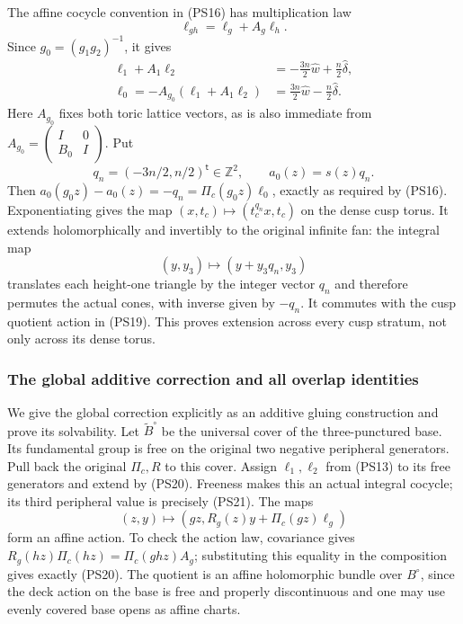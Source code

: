 The affine cocycle convention in (PS16) has multiplication law
\[
                    \ell_{gh}=\ell_g+A_g\ell_h.
 \tag{PS20}\label{wb:pshift:eq:cocycle-law}
\]
Since $g_0=(g_1g_2)^{-1}$, it gives
\[
\begin{aligned}
 \ell_1+A_1\ell_2
   &=-\frac{3n}{2}\widehat w+\frac n2\widehat\delta,\\
 \ell_0=-A_{g_0}(\ell_1+A_1\ell_2)
   &=\frac{3n}{2}\widehat w-\frac n2\widehat\delta.
\end{aligned}
\tag{PS21}\label{wb:pshift:eq:cusp-cocycle}
\]
Here $A_{g_0}$ fixes both toric lattice vectors, as is also immediate
from $A_{g_0}=\left(\begin{smallmatrix}I&0\\B_0&I\end{smallmatrix}\right)$.
Put
\[
 q_n=(-3n/2,n/2)^{\mathsf t}\in\mathbb Z^2,
                  \qquad a_0(z)=s(z)q_n.
 \tag{PS22}\label{wb:pshift:eq:cusp-translation}
\]
Then $a_0(g_0z)-a_0(z)=-q_n=\Pi_c(g_0z)\ell_0$, exactly as
required by (PS16). Exponentiating gives the map
$(x,t_c)\mapsto(t_c^{q_n}x,t_c)$ on the dense cusp torus.
It extends holomorphically and invertibly to the original infinite fan:
the integral map
\[
 (y,y_3)\longmapsto(y+y_3q_n,y_3)
\]
translates each height-one triangle by the integer vector $q_n$ and
therefore permutes the actual cones, with inverse given by $-q_n$.
It commutes with the cusp quotient action in (PS19). This proves
extension across every cusp stratum, not only across its dense torus.

\subsubsection{The global additive correction and all overlap identities}

We give the global correction explicitly as an additive gluing
construction and prove its solvability. Let $\widetilde B^\circ$ be
the universal cover of the three-punctured base. Its fundamental group
is free on the original two negative peripheral generators. Pull back
the original $\Pi_c,R$ to this cover. Assign $\ell_1,\ell_2$ from
(PS13) to its free generators and extend by (PS20). Freeness makes
this an actual integral cocycle; its third peripheral value is
precisely (PS21). The maps
\[
 (z,y)\longmapsto
       (gz,R_g(z)y+\Pi_c(gz)\ell_g)
 \tag{PS23}\label{wb:pshift:eq:affine-bundle-action}
\]
form an affine action. To check the action law, covariance gives
$R_g(hz)\Pi_c(hz)=\Pi_c(ghz)A_g$; substituting this equality
in the composition gives exactly (PS20).
The quotient is an affine holomorphic bundle over $B^\circ$, since
the deck action on the base is free and properly discontinuous and
one may use evenly covered base opens as affine charts.

